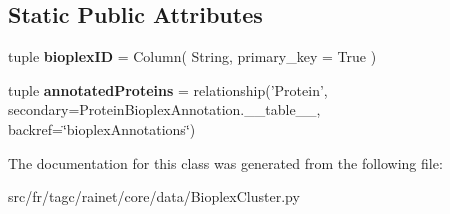 \subsection*{Static Public Attributes}
\begin{DoxyCompactItemize}
\item 
\hypertarget{classsrc_1_1fr_1_1tagc_1_1rainet_1_1core_1_1data_1_1BioplexCluster_1_1BioplexCluster_a95ffebe7d3accdcd290ea925625c2efd}{tuple {\bfseries bioplex\-I\-D} = Column( String, primary\-\_\-key = True )}\label{classsrc_1_1fr_1_1tagc_1_1rainet_1_1core_1_1data_1_1BioplexCluster_1_1BioplexCluster_a95ffebe7d3accdcd290ea925625c2efd}

\item 
\hypertarget{classsrc_1_1fr_1_1tagc_1_1rainet_1_1core_1_1data_1_1BioplexCluster_1_1BioplexCluster_ad9caecab8849f2f56b097a91499fbac1}{tuple {\bfseries annotated\-Proteins} = relationship('Protein', secondary=Protein\-Bioplex\-Annotation.\-\_\-\-\_\-table\-\_\-\-\_\-, backref=\char`\"{}bioplex\-Annotations\char`\"{})}\label{classsrc_1_1fr_1_1tagc_1_1rainet_1_1core_1_1data_1_1BioplexCluster_1_1BioplexCluster_ad9caecab8849f2f56b097a91499fbac1}

\end{DoxyCompactItemize}


The documentation for this class was generated from the following file\-:\begin{DoxyCompactItemize}
\item 
src/fr/tagc/rainet/core/data/Bioplex\-Cluster.\-py\end{DoxyCompactItemize}
